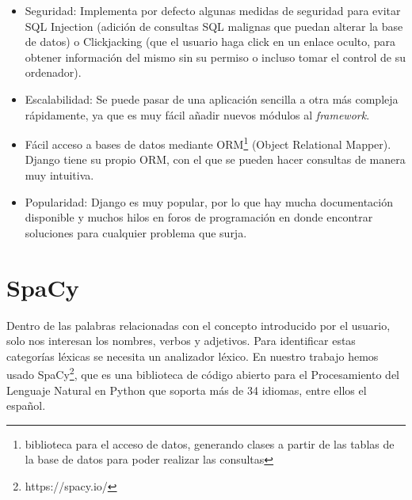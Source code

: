 \begin{itemize}
	\item Seguridad: Implementa por defecto algunas medidas de seguridad para evitar SQL Injection (adición de consultas SQL malignas que puedan alterar la base de datos) o Clickjacking (que el usuario haga click en un enlace oculto, para obtener información del mismo sin su permiso o incluso tomar el control de su ordenador).
	
	\item Escalabilidad: Se puede pasar de una aplicación sencilla a otra más compleja rápidamente, ya que es muy fácil añadir nuevos módulos al \textit{framework}.
	
	\item Fácil acceso a bases de datos mediante ORM\footnote{biblioteca para el acceso de datos, generando clases a partir de las tablas de la base de datos para poder realizar las consultas} (Object Relational Mapper). Django tiene su propio ORM, con el que se pueden hacer consultas de manera muy intuitiva.
	
	\item Popularidad: Django es muy popular, por lo que hay mucha documentación disponible y muchos hilos en foros de programación en donde encontrar soluciones para cualquier problema que surja.
	
\end{itemize}



\section{SpaCy}
\label{cap:sec:spacy}
Dentro de las palabras relacionadas con el concepto introducido por el usuario, solo nos interesan los nombres, verbos y adjetivos. Para identificar estas categorías léxicas se necesita un analizador léxico. En nuestro trabajo hemos usado SpaCy\footnote{https://spacy.io/}, que es una biblioteca de código abierto para el Procesamiento del Lenguaje Natural en Python que soporta más de 34 idiomas, entre ellos el español.




